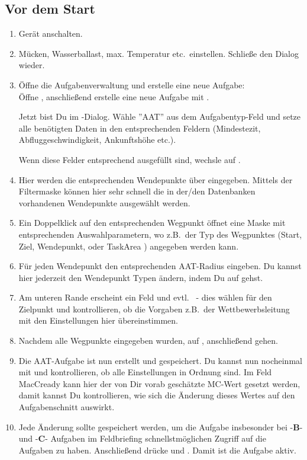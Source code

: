 \subsection*{Vor dem Start}
\begin{enumerate}
\item  Gerät anschalten.
\item  Mücken, Wasserballast, max. Temperatur etc.\ einstellen.
 Schließe den Dialog wieder.
\item Öffne die Aufgabenverwaltung und erstelle eine neue Aufgabe:\\
Öffne , anschließend erstelle eine neue Aufgabe mit .

Jetzt bist Du im  -Dialog. Wähle ''AAT'' aus dem Aufgabentyp-Feld und setze alle benötigten Daten in den entsprechenden Feldern (Mindestezit, Abfluggeschwindigkeit, Ankunftshöhe etc.).

Wenn diese Felder entsprechend ausgefüllt sind, wechsle auf .
\item Hier werden die entsprechenden Wendepunkte über  eingegeben.
Mittels der  Filtermaske können hier sehr schnell die in der/den Datenbanken vorhandenen Wendepunkte ausgewählt
werden.
\item Ein Doppelklick auf den entsprechenden Wegpunkt öffnet eine Maske mit entsprechenden Auswahlparametern, wo z.B.\ der Typ des Wegpunktes (Start, Ziel, Wendepunkt, oder TaskArea )
angegeben werden kann.
\item Für jeden Wendepunkt den entsprechenden AAT-Radius eingeben. Du kannst hier jederzeit den Wendepunkt Typen ändern, indem Du auf  gehst.
\item Am unteren Rande erscheint ein Feld  und evtl.\  - dies wählen für den Zielpunkt und kontrollieren, ob die Vorgaben z.B.\
der Wettbewerbsleitung mit den Einstellungen hier übereinstimmen.
\tip \item Nachdem alle Wegpunkte eingegeben wurden, auf , anschließend  gehen.
\item  Die AAT-Aufgabe ist nun erstellt und gespeichert. Du kannst nun nocheinmal mit \button{Rechner} und   kontrollieren, ob alle Einstellungen
in Ordnung sind. Im Feld MacCready kann hier der von Dir vorab geschätzte MC-Wert gesetzt werden, damit kannst Du kontrollieren,
wie sich die Änderung dieses Wertes auf den Aufgabenschnitt auswirkt.
\tip \item Jede Änderung sollte gespeichert werden, um die Aufgabe insbesonder bei -\textbf{B}-  und -\textbf{C}- Aufgaben im Feldbriefing schnellstmöglichen Zugriff auf die Aufgaben zu haben.
Anschließend drücke \button{Schließen} und \button{Fliegen}. Damit ist die Aufgabe aktiv.
\end{enumerate}

